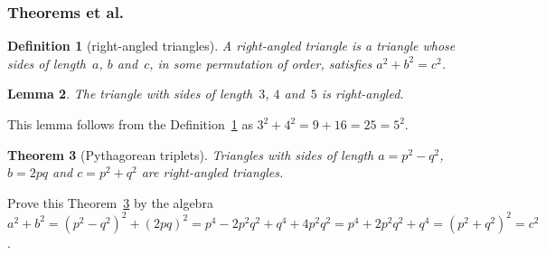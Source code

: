 \subsubsection{Theorems et al.}

\newtheorem{theorem}{Theorem}
\newtheorem{corollary}[theorem]{Corollary}
\newtheorem{lemma}[theorem]{Lemma}
\newtheorem{definition}[theorem]{Definition}

\begin{definition}[right-angled triangles] \label{def:tri}
	A \emph{right-angled triangle} is a triangle whose sides of length~\(a\), \(b\) and~\(c\), in some permutation of order, satisfies \(a^2+b^2=c^2\).
\end{definition}

\begin{lemma} 
	The triangle with sides of length~\(3\), \(4\) and~\(5\) is right-angled.
\end{lemma}

This lemma follows from the Definition~\ref{def:tri} as \(3^2+4^2=9+16=25=5^2\).

\begin{theorem}[Pythagorean triplets] \label{thm:py}
	Triangles with sides of length \(a=p^2-q^2\), \(b=2pq\) and \(c=p^2+q^2\) are right-angled triangles.
\end{theorem}

Prove this Theorem~\ref{thm:py} by the algebra \(a^2+b^2 =(p^2-q^2)^2+(2pq)^2
=p^4-2p^2q^2+q^4+4p^2q^2
=p^4+2p^2q^2+q^4
=(p^2+q^2)^2 =c^2\).
